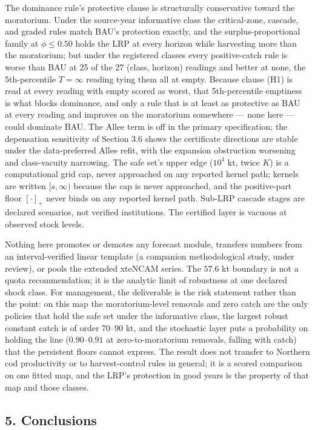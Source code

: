 \documentclass[11pt]{article}
\begin{document}
The dominance rule's protective clause is structurally conservative
toward the moratorium. Under the source-year informative class the
critical-zone, cascade, and graded rules match BAU's protection exactly,
and the surplus-proportional family at \(\phi \le 0.50\) holds the LRP
at every horizon while harvesting more than the moratorium; but under
the registered classes every positive-catch rule is worse than BAU at
25 of the 27 (class, horizon) readings and better at none, the
5th-percentile \(T=\infty\) reading tying them all at empty. Because
clause
(H1) is read at every reading with empty scored as worst, that
5th-percentile emptiness is what blocks dominance, and only a rule that
is at least as protective as BAU at every reading and improves on the
moratorium somewhere --- none here --- could dominate BAU. The Allee
term is off in the primary specification; the depensation sensitivity of
Section 3.6 shows the certificate directions are stable under the
data-preferred Allee refit, with the expansion obstruction worsening and
class-vacuity narrowing. The safe set's upper edge (\(10^4\) kt, twice
\(K\)) is a computational grid cap, never approached on any reported
kernel path; kernels are written \([s, \infty)\) because the cap is
never approached, and the positive-part floor \([\cdot]_+\) never binds
on any reported kernel path. Sub-LRP cascade stages are declared
scenarios, not verified institutions. The certified layer is vacuous at
observed stock levels.

Nothing here promotes or demotes any forecast module, transfers numbers
from an interval-verified linear template (a companion methodological
study, under review), or pools the extended xteNCAM series. The \(57.6\)
kt boundary is not a quota recommendation; it is the analytic limit of
robustness at one declared shock class. For management, the deliverable
is the risk statement rather than the point: on this map the
moratorium-level removals and zero catch are the only policies that hold
the safe set under the informative class, the largest robust constant
catch is of order \(70\)--\(90\) kt, and the stochastic layer puts a
probability on holding the line (\(0.90\)--\(0.91\) at
zero-to-moratorium removals, falling with catch) that the persistent
floors cannot express. The result does not transfer to Northern cod
productivity or to harvest-control rules in general; it is a scored
comparison on one fitted map, and the LRP's protection in good years is
the property of that map and those classes.

\subsection{5. Conclusions}\label{conclusions}
\end{document}
